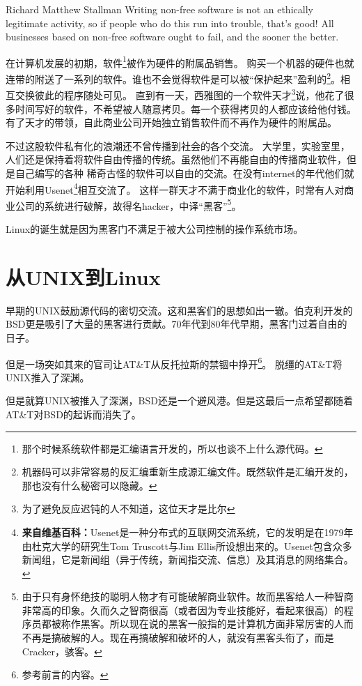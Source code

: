 
\begin{quotes}{Richard Matthew Stallman}
Writing non-free software is not an ethically legitimate activity, so if people who do this run into trouble, that's good! All businesses based on non-free software ought to fail, and the sooner the better.
\end{quotes}

在计算机发展的初期，软件\footnote{那个时候系统软件都是汇编语言开发的，所以也谈不上什么源代码。}被作为硬件的附属品销售。
购买一个机器的硬件也就连带的附送了一系列的软件。谁也不会觉得软件是可以被“保护起来”盈利的\footnote{机器码可以非常容易的反汇编重新生成源汇编文件。既然软件是汇编开发的，那也没有什么秘密可以隐藏。}。相互交换彼此的程序随处可见。
直到有一天，西雅图的一个软件天才\footnote{为了避免反应迟钝的人不知道，这位天才是比尔}说，他花了很多时间写好的软件，不希望被人随意拷贝。每一个获得拷贝的人都应该给他付钱。
有了天才的带领，自此商业公司开始独立销售软件而不再作为硬件的附属品。

不过这股软件私有化的浪潮还不曾传播到社会的各个交流。
大学里，实验室里，人们还是保持着将软件自由传播的传统。虽然他们不再能自由的传播商业软件，但是自己编写的各种
稀奇古怪的软件可以自由的交流。在没有internet的年代他们就开始利用Usenet\footnote{%
\textbf{来自维基百科：}Usenet是一种分布式的互联网交流系统，它的发明是在1979年由杜克大学的研究生Tom Truscott与Jim Ellis所设想出来的。Usenet包含众多新闻组，它是新闻组（异于传统，新闻指交流、信息）及其消息的网络集合。 }相互交流了。
%
这样一群天才不满于商业化的软件，时常有人对商业公司的系统进行破解，故得名hacker，中译“黑客”\footnote{%
由于只有身怀绝技的聪明人物才有可能破解商业软件。故而黑客给人一种智商非常高的印象。久而久之智商很高（或者因为专业技能好，看起来很高）的程序员都被称作黑客。所以现在说的黑客一般指的是计算机方面非常厉害的人而不再是搞破解的人。现在再搞破解和破坏的人，就没有黑客头衔了，而是Cracker，骇客。
}。

Linux的诞生就是因为黑客门不满足于被大公司控制的操作系统市场。

\section{从UNIX到Linux}

早期的UNIX鼓励源代码的密切交流。这和黑客们的思想如出一辙。伯克利开发的BSD更是吸引了大量的黑客进行贡献。70年代到80年代早期，黑客门过着自由的日子。


但是一场突如其来的官司让AT\&T从反托拉斯的禁锢中挣开\footnote{参考前言的内容。}。
脱缰的AT\&T将UNIX推入了深渊。

但是就算UNIX被推入了深渊，BSD还是一个避风港。但是这最后一点希望都随着AT\&T对BSD的起诉而消失了。

